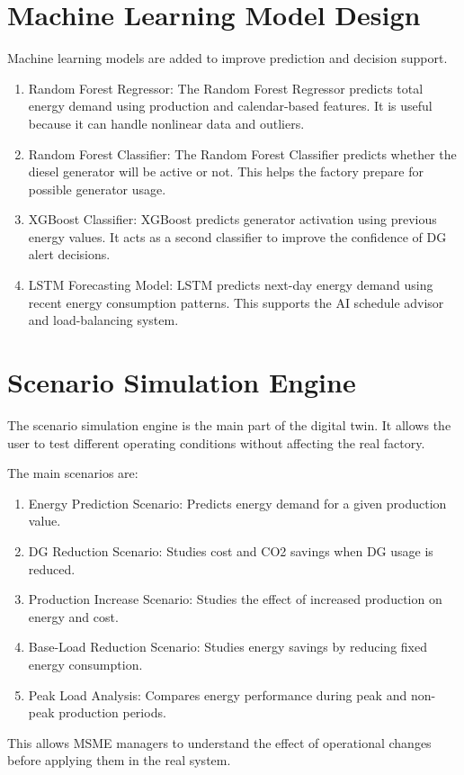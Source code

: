\section{Machine Learning Model Design}
Machine learning models are added to improve prediction and decision support.
\begin{enumerate}
    \item Random Forest Regressor: The Random Forest Regressor predicts total energy demand using production and calendar-based features. It is useful because it can handle nonlinear data and outliers.
    \item Random Forest Classifier: The Random Forest Classifier predicts whether the diesel generator will be active or not. This helps the factory prepare for possible generator usage.
    \item XGBoost Classifier: XGBoost predicts generator activation using previous energy values. It acts as a second classifier to improve the confidence of DG alert decisions.
    \item LSTM Forecasting Model: LSTM predicts next-day energy demand using recent energy consumption patterns. This supports the AI schedule advisor and load-balancing system.
\end{enumerate}

\section{Scenario Simulation Engine}
The scenario simulation engine is the main part of the digital twin. It allows the user to test different operating conditions without affecting the real factory.

The main scenarios are:
\begin{enumerate}
    \item Energy Prediction Scenario: Predicts energy demand for a given production value.
    \item DG Reduction Scenario: Studies cost and CO2 savings when DG usage is reduced.
    \item Production Increase Scenario: Studies the effect of increased production on energy and cost.
    \item Base-Load Reduction Scenario: Studies energy savings by reducing fixed energy consumption.
    \item Peak Load Analysis: Compares energy performance during peak and non-peak production periods.
\end{enumerate}
This allows MSME managers to understand the effect of operational changes before applying them in the real system.

